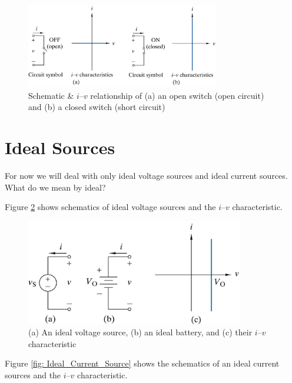 \documentclass{handout}
\begin{document}
\begin{figure}[h b t]
\centering
\includegraphics[width=0.75\textwidth]{Switch.jpg}
\caption{Schematic \& $i$--$v$ relationship of (a) an open switch (open circuit) and (b) a closed switch (short circuit)}
\label{fig: Switch}
\end{figure}

\newpage

\section{Ideal Sources}
For now we will deal with only ideal voltage sources and ideal current sources.  What do we mean by ideal?


Figure \ref{fig: Ideal_Voltage_Source} shows schematics of ideal voltage sources and the  $i$--$v$ characteristic.

\begin{figure}[h b t]
\centering
\includegraphics[width=0.85\textwidth]{Ideal_Voltage_Source.jpg}
\caption{(a) An ideal voltage source,  (b) an ideal battery, and (c) their $i$--$v$ characteristic}
\label{fig: Ideal_Voltage_Source}
\end{figure}

Figure \ref{fig: Ideal_Current_Source} shows the schematics of an ideal current sources and the  $i$--$v$ characteristic.
\end{document}
